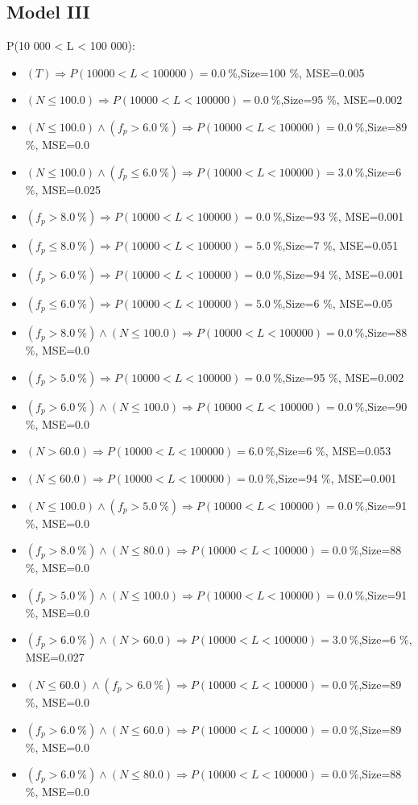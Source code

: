 \documentclass[numbered]{CSL}
\begin{document}
\subsection{Model III}
P(10 000 < L < 100 000):
\begin{itemize}
\item $(T) \Rightarrow P(10 000 < L < 100 000) = 0.0~\%$,\hfill Size=100 \%, MSE=0.005
\item $(N \leq 100.0) \Rightarrow P(10 000 < L < 100 000) = 0.0~\%$,\hfill Size=95 \%, MSE=0.002
\item $(N \leq 100.0) \land (f_p > 6.0~\%) \Rightarrow P(10 000 < L < 100 000) = 0.0~\%$,\hfill Size=89 \%, MSE=0.0
\item $(N \leq 100.0) \land (f_p \leq 6.0~\%) \Rightarrow P(10 000 < L < 100 000) = 3.0~\%$,\hfill Size=6 \%, MSE=0.025
\item $(f_p > 8.0~\%) \Rightarrow P(10 000 < L < 100 000) = 0.0~\%$,\hfill Size=93 \%, MSE=0.001
\item $(f_p \leq 8.0~\%) \Rightarrow P(10 000 < L < 100 000) = 5.0~\%$,\hfill Size=7 \%, MSE=0.051
\item $(f_p > 6.0~\%) \Rightarrow P(10 000 < L < 100 000) = 0.0~\%$,\hfill Size=94 \%, MSE=0.001
\item $(f_p \leq 6.0~\%) \Rightarrow P(10 000 < L < 100 000) = 5.0~\%$,\hfill Size=6 \%, MSE=0.05
\item $(f_p > 8.0~\%) \land (N \leq 100.0) \Rightarrow P(10 000 < L < 100 000) = 0.0~\%$,\hfill Size=88 \%, MSE=0.0
\item $(f_p > 5.0~\%) \Rightarrow P(10 000 < L < 100 000) = 0.0~\%$,\hfill Size=95 \%, MSE=0.002
\item $(f_p > 6.0~\%) \land (N \leq 100.0) \Rightarrow P(10 000 < L < 100 000) = 0.0~\%$,\hfill Size=90 \%, MSE=0.0
\item $(N > 60.0) \Rightarrow P(10 000 < L < 100 000) = 6.0~\%$,\hfill Size=6 \%, MSE=0.053
\item $(N \leq 60.0) \Rightarrow P(10 000 < L < 100 000) = 0.0~\%$,\hfill Size=94 \%, MSE=0.001
\item $(N \leq 100.0) \land (f_p > 5.0~\%) \Rightarrow P(10 000 < L < 100 000) = 0.0~\%$,\hfill Size=91 \%, MSE=0.0
\item $(f_p > 8.0~\%) \land (N \leq 80.0) \Rightarrow P(10 000 < L < 100 000) = 0.0~\%$,\hfill Size=88 \%, MSE=0.0
\item $(f_p > 5.0~\%) \land (N \leq 100.0) \Rightarrow P(10 000 < L < 100 000) = 0.0~\%$,\hfill Size=91 \%, MSE=0.0
\item $(f_p > 6.0~\%) \land (N > 60.0) \Rightarrow P(10 000 < L < 100 000) = 3.0~\%$,\hfill Size=6 \%, MSE=0.027
\item $(N \leq 60.0) \land (f_p > 6.0~\%) \Rightarrow P(10 000 < L < 100 000) = 0.0~\%$,\hfill Size=89 \%, MSE=0.0
\item $(f_p > 6.0~\%) \land (N \leq 60.0) \Rightarrow P(10 000 < L < 100 000) = 0.0~\%$,\hfill Size=89 \%, MSE=0.0
\item $(f_p > 6.0~\%) \land (N \leq 80.0) \Rightarrow P(10 000 < L < 100 000) = 0.0~\%$,\hfill Size=88 \%, MSE=0.0
\end{itemize}
\end{document}
